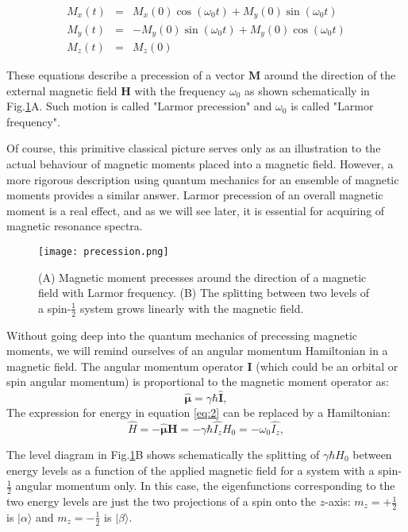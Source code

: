 \documentclass[a4paper, 12pt]{article}
\begin{document}
\begin{equation} 
\begin{array}{lcl}
M_x(t) &=& M_x(0) \cos(\omega_0 t) + M_y(0) \sin (\omega_0 t) \\
M_y(t) &=& -M_y(0) \sin(\omega_0 t) + M_y(0) \cos (\omega_0 t) \\
M_z(t) &=& M_z(0) 
\end{array}
\end{equation}

These equations describe a precession of a vector $\bm{M}$ around the direction of the external magnetic field $\bm{H}$ with the frequency $\omega_0$ as shown schematically in Fig.\ref{fig:precession}A. Such motion is called  "Larmor precession" and $\omega_0$ is called "Larmor frequency".

Of course, this primitive classical picture serves only as an illustration to the actual behaviour of magnetic moments placed into a magnetic field. However, a more rigorous description using quantum mechanics for an ensemble of magnetic moments provides a similar answer. Larmor precession of an overall magnetic moment is a real effect, and as we will see later, it is essential for acquiring of magnetic resonance spectra.

\begin{figure}[ht]
\caption{(A) Magnetic moment precesses around the direction of a magnetic field with Larmor frequency. (B) The splitting between two levels of a spin-$\frac{1}{2}$ system grows linearly with the magnetic field.}
\label{fig:precession}
\centering
\texttt{[image: precession.png]}
\end{figure}

Without going deep into the quantum mechanics of precessing magnetic moments, we will remind ourselves of an angular momentum Hamiltonian in a magnetic field. The angular momentum operator $\bm{I}$ (which could be an orbital or spin angular momentum) is proportional to the magnetic moment operator as:
\begin{equation} \label{eq:3}
\bm{\hat{\mu}} = \gamma \hbar \bm{\hat{I}},
\end{equation}
The expression for energy in equation \ref{eq:2} can be replaced by a Hamiltonian:
\begin{equation} \label{eq:2level}
\hat{H} = -\bm{\hat{\mu}} \bm{H} = -\gamma \hbar \hat{I_z} H_0 = -\omega_0 \hat{I_z},
\end{equation}

The level diagram in Fig.\ref{fig:precession}B shows schematically the splitting of $\gamma \hbar H_0 $ between energy levels  as a function of the applied magnetic field for a system with  a spin-$\frac{1}{2}$ angular momentum only. In this case, the eigenfunctions corresponding to the two energy levels are just the two projections of a spin onto the $z$-axis: $m_z=+\frac{1}{2}$ is $\vert \alpha \rangle$ and $m_z=-\frac{1}{2}$ is $\vert \beta \rangle$.
\end{document}
